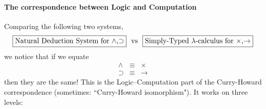 \documentclass[12pt]{article}
\begin{document}
\paragraph{The correspondence between Logic and Computation} Comparing the following two systems,
\[
  \fbox{Natural Deduction System for $\wedge$,$\supset$}\text{ \ vs \ }
  \fbox{Simply-Typed $\lambda$-calculus for $\times$,$\rightarrow$}
\]
we notice that if we equate
\[ \begin{array}{lcl}
\wedge & \equiv & \times \\
\supset & \equiv & \rightarrow
\end{array} \]
then they are the same! This is the Logic--Computation part of the Curry-Howard correspondence (sometimes: ``Curry-Howard isomorphism"). It works on three levels:
\begin{center}
\end{center}
%
%
\end{document}
